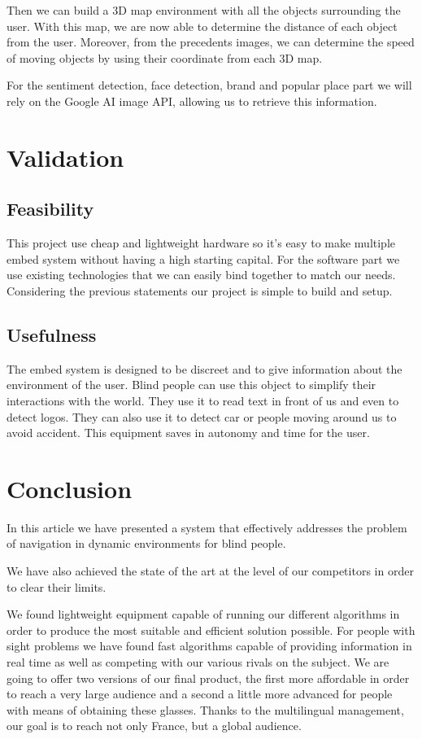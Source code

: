 \documentclass[conference,compsoc]{IEEEtran}
\begin{document}
Then we can build a 3D map environment with all the objects surrounding the user. With this map, we are now able to determine the distance of each object from the user. Moreover, from the precedents images, we can determine the speed of moving objects by using their coordinate from each 3D map. 

For the sentiment detection, face detection, brand and popular place part we will rely on the Google AI image API, allowing us to retrieve this information.

\section{Validation}
\subsection{Feasibility}
This project use cheap and lightweight hardware so it's easy to make multiple embed system without having a high starting capital. For the software part we use existing technologies that we can easily bind together to match our needs. Considering the previous statements our project is simple to build and setup.

\subsection{Usefulness}
The embed system is designed to be discreet and to give information about the environment of the user. Blind people can use this object to simplify their interactions with the world. They use it to read text in front of us and even to detect logos. They can also use it to detect car or people moving around us to avoid accident.
This equipment saves in autonomy and time for the user.

\section{Conclusion}

In this article we have presented a system that effectively addresses the problem of navigation in dynamic environments for blind people. 

We have also achieved the state of the art at the level of our competitors in order to clear their limits.

We found lightweight equipment capable of running our different algorithms in order to produce the most suitable and efficient solution possible.
For people with sight problems we have found fast algorithms capable of providing information in real time as well as competing with our various rivals on the subject.
We are going to offer two versions of our final product, the first more affordable in order to reach a very large audience and a second a little more advanced for people with means of obtaining these glasses. Thanks to the multilingual management, our goal is to reach not only France, but a global audience.





\end{document}
